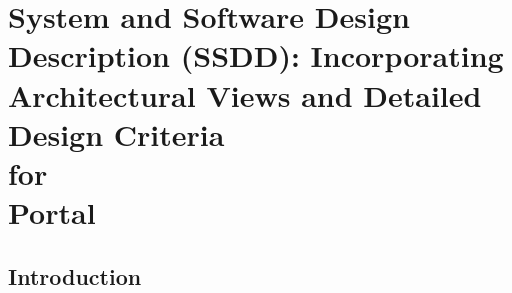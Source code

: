 \documentclass[12pt, oneside, letterpaper]{report}
\begin{document}
\part{System and Software Design Description (SSDD): Incorporating
     Architectural Views and Detailed Design Criteria \\ for \\ Portal}
\tableofcontents                                %
\listoffigures
\listoftables
\chapter{Introduction}
\end{document}
